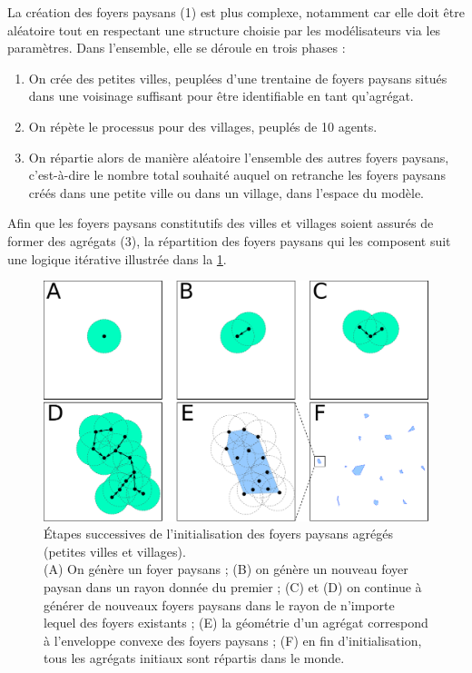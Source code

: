 La création des foyers paysans (1) est plus complexe, notamment car elle doit être aléatoire tout en respectant une structure choisie par les modélisateurs via les paramètres.
Dans l'ensemble, elle se déroule en trois phases :
\begin{enumerate}
	\item On crée des \og petites villes\fg{}, peuplées d'une trentaine de foyers paysans situés dans une voisinage suffisant pour être identifiable en tant qu'agrégat.
	\item On répète le processus pour des \og villages\fg{}, peuplés de 10 agents.
	\item On répartie alors de manière aléatoire l'ensemble des autres foyers paysans, c'est-à-dire le nombre total souhaité auquel on retranche les foyers paysans créés dans une petite ville ou dans un village, dans l'espace du modèle.
\end{enumerate}
Afin que les foyers paysans constitutifs des villes et villages soient assurés de former des agrégats (3), la répartition des foyers paysans qui les composent suit une logique itérative illustrée dans la \cref{fig:init-fp}.

\begin{figure}[H]
	\centering
	\includegraphics[width=.98\linewidth]{img/init_fp.pdf}
	\caption{Étapes successives de l'initialisation des foyers paysans agrégés (petites villes et villages).\\
	(A) On génère un foyer paysans ;
	(B) on génère un nouveau foyer paysan dans un rayon donnée du premier ;
	(C) et (D) on continue à générer de nouveaux foyers paysans dans le rayon de n'importe lequel des foyers existants ;
	(E) la géométrie d'un agrégat correspond à l'enveloppe convexe des foyers paysans ;
	(F) en fin d'initialisation, tous les agrégats initiaux sont répartis dans le monde.}
	\label{fig:init-fp}
\end{figure}



